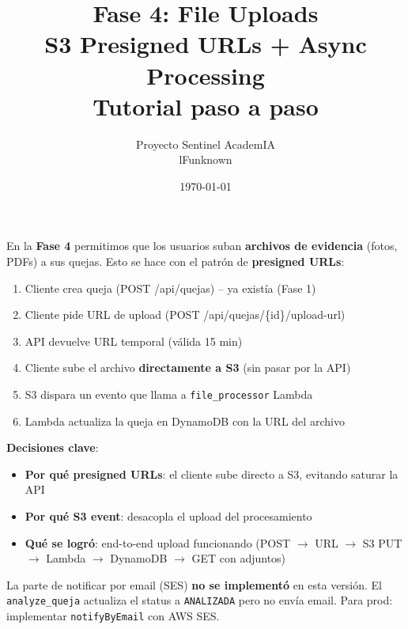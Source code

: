 \documentclass[11pt,a4paper,oneside]{article}
\title{\Huge\textbf{Fase 4: File Uploads} \\[0.3em]
       \Large S3 Presigned URLs + Async Processing \\[0.5em]
       \normalsize Tutorial paso a paso}
\author{Proyecto Sentinel AcademIA \\ \small lFunknown}
\date{\today}
\begin{document}
\maketitle
\thispagestyle{empty}

\begin{tcolorbox}[colback=blue!5!white,colframe=infoblue,title={\textbf{¿Qué construimos en este tutorial?}}]
En la \textbf{Fase 4} permitimos que los usuarios suban \textbf{archivos de evidencia} (fotos, PDFs) a sus quejas. Esto se hace con el patr\'on de \textbf{presigned URLs}:

\begin{enumerate}
  \item Cliente crea queja (POST /api/quejas) -- ya exist\'ia (Fase 1)
  \item Cliente pide URL de upload (POST /api/quejas/\{id\}/upload-url)
  \item API devuelve URL temporal (v\'alida 15 min)
  \item Cliente sube el archivo \textbf{directamente a S3} (sin pasar por la API)
  \item S3 dispara un evento que llama a \texttt{file\_processor} Lambda
  \item Lambda actualiza la queja en DynamoDB con la URL del archivo
\end{enumerate}

\textbf{Decisiones clave}:
\begin{itemize}
  \item \textbf{Por qu\'e presigned URLs}: el cliente sube directo a S3, evitando saturar la API
  \item \textbf{Por qu\'e S3 event}: desacopla el upload del procesamiento
  \item \textbf{Qu\'e se logr\'o}: end-to-end upload funcionando (POST $\rightarrow$ URL $\rightarrow$ S3 PUT $\rightarrow$ Lambda $\rightarrow$ DynamoDB $\rightarrow$ GET con adjuntos)
\end{itemize}
\end{tcolorbox}

\begin{tcolorbox}[colback=warnorange!5!white,colframe=warnorange,title={\textbf{Email (SES) -- no implementado en esta versi\'on}}]
La parte de notificar por email (SES) \textbf{no se implement\'o} en esta versi\'on. El \texttt{analyze\_queja} actualiza el status a \texttt{ANALIZADA} pero no env\'ia email. Para prod: implementar \texttt{notifyByEmail} con AWS SES.
\end{tcolorbox}
\end{document}
